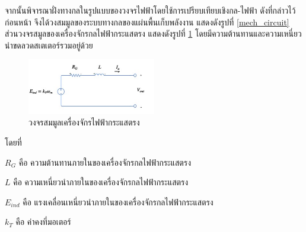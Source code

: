 \documentclass[11pt,a4paper]{article}
\begin{document}
จากนั้นพิจารณาฝั่งทางกลในรูปแบบของวงจรไฟฟ้าโดยใช้การเปรียบเทียบเชิงกล-ไฟฟ้า ดังที่กล่าวไว้ก่อนหน้า จึงได้วงสมมูลของระบบทางกลของแผ่นพื้นเก็บพลังงาน แสดงดังรูปที่ \ref{mech_circuit}
ส่วนวงจรสมูลของเครื่องจักรกลไฟฟ้ากระแสตรง แสดงดังรูปที่ \ref{dc_motor_circuit} โดยมีความต้านทานและความเหนี่ยวนำขดลวดสเตเตอร์รวมอยู่ด้วย
\begin{figure}[H]
    \begin{center}
        \includegraphics[width=0.5\textwidth]{dc_motor_circuit.jpg}
    \end{center}
    \caption{วงจรสมมูลเครื่องจักรไฟฟ้ากระแสตรง}
    \label{dc_motor_circuit}
\end{figure}
โดยที่

$R_{G}$      คือ ความต้านทานภายในของเครื่องจักรกลไฟฟ้ากระแสตรง

$L$ 	     คือ ความเหนี่ยวนำภายในของเครื่องจักรกลไฟฟ้ากระแสตรง

$E_{ind}$	 คือ แรงเคลื่อนเหนี่ยวนำภายในของเครื่องจักรกลไฟฟ้ากระแสตรง

$k_{T}$      คือ ค่าคงที่มอเตอร์
\end{document}
